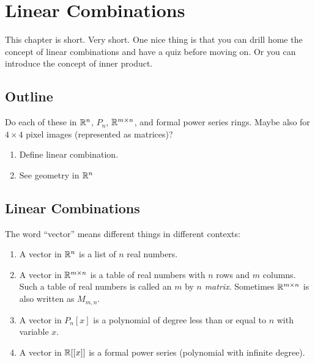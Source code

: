 \chapter{Linear Combinations}

This chapter is short.  Very short.  One nice thing is that you can
drill home the concept of linear combinations and have a quiz before
moving on.  Or you can introduce the concept of inner product.

\section{Outline}
  Do each of these in $\mathbb{R}^n$, $P_n$, $\mathbb{R}^{m\times n}$, and formal
  power series rings.  Maybe also for $4\times 4$ pixel images
  (represented as matrices)?
  \begin{enumerate}
  \item Define linear combination.
  \item See geometry in $\mathbb{R}^n$
  \end{enumerate}

\section{Linear Combinations}

\begin{definition}
  The word ``vector'' means different things in different contexts:
  \begin{enumerate}
  \item A vector in $\mathbb{R}^n$ is a list of $n$ real numbers.
  \item A vector in $\mathbb{R}^{m\times n}$ is a table of real numbers with
    $n$ rows and $m$ columns.  Such a table of real numbers is called
    an $m$ by $n$ \emph{matrix}.  Sometimes $\mathbb{R}^{m\times n}$ is also
    written as $M_{m,n}$.
  \item A vector in $P_n[x]$ is a polynomial of degree less than or equal
    to $n$ with variable $x$.
  \item A vector in $\mathbb{R}[[x]]$ is a formal power series (polynomial with
    infinite degree).
  \end{enumerate}
\end{definition}

